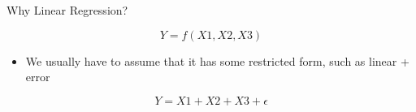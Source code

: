 \documentclass[australian,ignorenonframetext,aspectratio=169]{beamer}
\providecommand{\tightlist}{%
  \setlength{\itemsep}{0pt}\setlength{\parskip}{0pt}}
\begin{document}
\begin{frame}{Why Linear Regression?}
\protect\hypertarget{why-linear-regression}{}


\[Y = f(X1, X2, X3)\]

\begin{itemize}
\tightlist
\item
  We usually have to assume that it has some restricted form, such as
  linear + error
\end{itemize}

\[Y = X1 + X2 + X3 + \epsilon\]

\end{frame}
\end{document}
